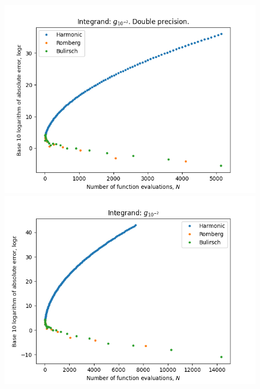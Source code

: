 \begin{figure}[H]
\centering
\begin{minipage}{0.45\textwidth}
\centering
\includegraphics[scale=0.45]{../results/romberg_plots/g_hundredth.png}
\end{minipage}
\begin{minipage}{0.45\textwidth}
\centering
\includegraphics[scale=0.45]{../results/romberg_plots/g_hundredth_hp.png}
\end{minipage}
\end{figure}

